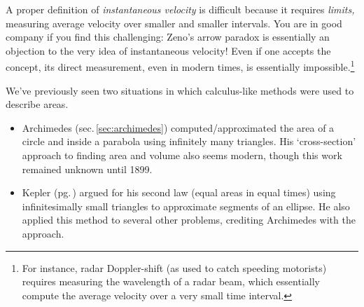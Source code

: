 A proper definition of \emph{instantaneous velocity} is difficult because it requires \emph{limits,} measuring average velocity over smaller and smaller intervals. You are in good company if you find this challenging: Zeno's arrow paradox is essentially an objection to the very idea of instantaneous velocity! Even if one accepts the concept, its direct measurement, even in modern times, is essentially impossible.\footnote{%
	For instance, radar Doppler-shift (as used to catch speeding motorists) requires measuring the wavelength of a radar beam, which essentially compute the average velocity over a very small time interval. %
}



We've previously seen two situations in which calculus-like methods were used to describe areas.
\begin{itemize}
  \item Archimedes (sec.\,\ref{sec:archimedes}) computed/approximated the area of a circle and inside a parabola using infinitely many triangles. His `cross-section' approach to finding area and volume also seems modern, though this work remained unknown until 1899.
  \item Kepler (pg.\,\pageref{pg:kepler2}) argued for his second law (equal areas in equal times) using infinitesimally small triangles to approximate segments of an ellipse. He also applied this method to several other problems, crediting Archimedes with the approach.
\end{itemize}


